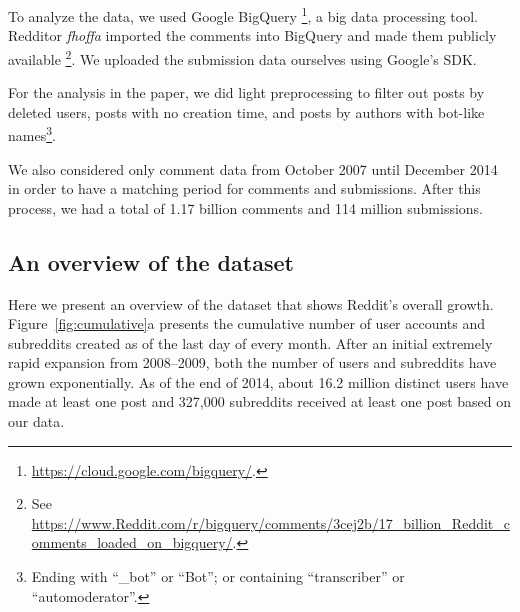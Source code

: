 To analyze the data, we used Google BigQuery \footnote{\url{https://cloud.google.com/bigquery/}.}, a big data processing tool.
Redditor \textit{fhoffa} imported the comments into BigQuery and made them publicly available \footnote{See \url{https://www.Reddit.com/r/bigquery/comments/3cej2b/17_billion_Reddit_comments_loaded_on_bigquery/}.}.  We uploaded the submission data ourselves using Google's SDK.


For the analysis in the paper, we did light preprocessing to filter out posts by deleted users, posts with no creation time, and posts by authors with
bot-like names\footnote{Ending with ``\_bot'' or ``Bot''; or containing ``transcriber'' or ``automoderator''.}.

We also considered only comment data from October 2007 until December 2014 in order to have a matching period for comments and submissions. After this process, we had a total of 1.17 billion comments and 114 million submissions.

\begin{figure*}[!tb]
\centering
{}
\caption{Figure (a) shows the cumulative growth of Reddit for users and subreddits. Figure (b) shows the number of active users and subreddits in Reddit over time. An active user or subreddit is one that had at least one post (comment or submission) in the time bin we used---here, discretized by month.}
\label{fig:cumulative}
\end{figure*}

\subsection{An overview of the dataset}

Here we present an overview of the dataset that shows Reddit's overall growth.  Figure~\ref{fig:cumulative}a presents the cumulative number of user accounts and subreddits created as of the last day of every month. After an initial extremely rapid expansion from 2008--2009, both the number of users and subreddits have grown exponentially.  As of the end of 2014, about 16.2 million distinct users have made at least one post and 327,000 subreddits received at least one post based on our data.

